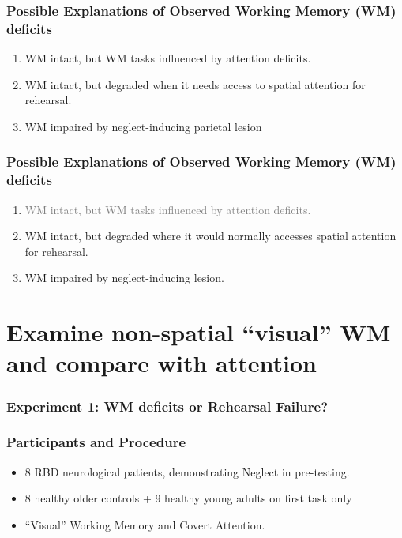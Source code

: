 \documentclass{beamer}
\begin{document}
\begin{frame}
	\frametitle{Possible Explanations of Observed Working Memory (WM) deficits}
	\begin{enumerate}
		\item WM intact, but WM tasks influenced by attention deficits.
		\item WM intact, but degraded when it needs access to spatial attention for rehearsal.
		\item WM impaired by neglect-inducing parietal lesion
	\end{enumerate}
\end{frame}

\begin{frame}
	\frametitle{Possible Explanations of Observed Working Memory (WM) deficits}
	\begin{enumerate}
		\item \textcolor{gray}{WM intact, but WM tasks influenced by attention deficits.}
		\item WM intact, but degraded where it would normally accesses spatial attention for rehearsal.
		\item WM impaired by neglect-inducing lesion.
	\end{enumerate}
\end{frame}


\section[Attention and WM]{Examine non-spatial ``visual'' WM and compare with attention}

\begin{frame}
	\frametitle{Experiment 1: WM deficits or Rehearsal Failure?}
		\tableofcontents[currentsection]
\end{frame}

\begin{frame}
\frametitle{Participants and Procedure}
\begin{itemize}
	\item 8 RBD neurological patients, demonstrating Neglect in pre-testing.
	\item 8 healthy older controls + 9 healthy young adults on first task only
	\item ``Visual'' Working Memory and Covert Attention.
\end{itemize}
\end{frame}
\end{document}
